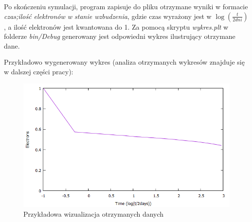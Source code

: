 Po skończeniu symulacji, program zapisuje do pliku otrzymane wyniki w formacie \textit{czas;ilość elektronów w stanie wzbudzenia}, gdzie czas wyrażony jest w $ \log(\frac{t}{2 dni}) $, a ilość elektronów jest kwantowana do 1. Za pomocą skryptu \textit{wykres.plt}
w folderze \textit{bin/Debug} generowany jest odpowiedni wykres ilustrujący otrzymane dane. 

Przykładowo wygenerowany wykres (analiza otrzymanych wykresów znajduje się w dalszej części pracy):

\begin{figure}[H]
\centering
\includegraphics[width=15cm]{example}
\caption{Przykładowa wizualizacja otrzymanych danych}
\label{fig:example}
\end{figure}

